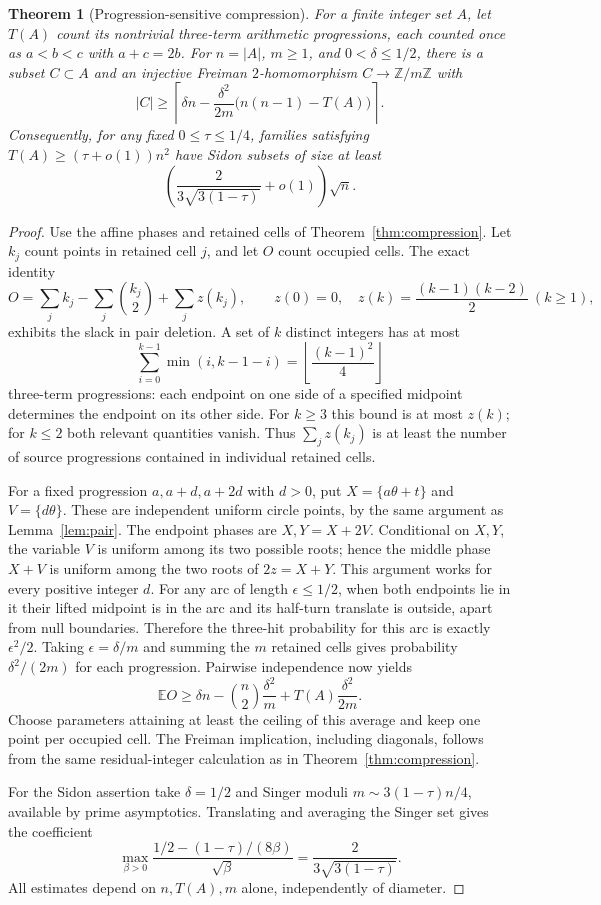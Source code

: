 \documentclass[11pt]{article}
\newtheorem{theorem}{Theorem}[section]
\theoremstyle{definition}
\theoremstyle{remark}
\newcommand{\Z}{\mathbb Z}
\newcommand{\E}{\mathbb E}
\begin{document}
\begin{theorem}[Progression-sensitive compression]\label{thm:ap-surplus}
For a finite integer set $A$, let $T(A)$ count its nontrivial three-term
arithmetic progressions, each counted once as $a<b<c$ with $a+c=2b$.
For $n=|A|$, $m\ge1$, and $0<\delta\le1/2$, there is a subset
$C\subset A$ and an injective Freiman $2$-homomorphism
$C\to\Z/m\Z$ with
\[
|C|\ge\left\lceil\delta n-
\frac{\delta^2}{2m}\bigl(n(n-1)-T(A)\bigr)\right\rceil.
\]
Consequently, for any fixed $0\le\tau\le1/4$, families satisfying
$T(A)\ge(\tau+o(1))n^2$ have Sidon subsets of size at least
\[
\left(\frac{2}{3\sqrt{3(1-\tau)}}+o(1)\right)\sqrt n.
\]
\end{theorem}
\begin{proof}
Use the affine phases and retained cells of
Theorem~\ref{thm:compression}. Let $k_j$ count points in retained cell
$j$, and let $O$ count occupied cells. The exact identity
\[
O=\sum_j k_j-\sum_j\binom{k_j}{2}+\sum_j z(k_j),
\qquad z(0)=0,\quad z(k)=\frac{(k-1)(k-2)}2\ (k\ge1),
\]
exhibits the slack in pair deletion. A set of $k$ distinct integers
has at most
\[
\sum_{i=0}^{k-1}\min(i,k-1-i)
=\left\lfloor\frac{(k-1)^2}{4}\right\rfloor
\]
three-term progressions: each endpoint on one side of a specified
midpoint determines the endpoint on its other side. For $k\ge3$ this
bound is at most $z(k)$; for $k\le2$ both relevant quantities vanish.
Thus $\sum_jz(k_j)$ is at least the number of source progressions
contained in individual retained cells.

For a fixed progression $a,a+d,a+2d$ with $d>0$, put
$X=\{a\theta+t\}$ and $V=\{d\theta\}$. These are independent
uniform circle points, by the same argument as Lemma~\ref{lem:pair}.
The endpoint phases are $X,Y=X+2V$. Conditional on $X,Y$, the variable
$V$ is uniform among its two possible roots; hence the middle phase
$X+V$ is uniform among the two roots of $2z=X+Y$.
This argument works for every positive integer $d$.
For any arc of length $\epsilon\le1/2$, when both endpoints lie in
it their lifted midpoint is in the arc and its half-turn translate
is outside, apart from null boundaries. Therefore the three-hit
probability for this arc is exactly $\epsilon^2/2$.
Taking $\epsilon=\delta/m$ and summing the $m$ retained cells gives
probability $\delta^2/(2m)$ for each progression. Pairwise independence
now yields
\[
\E O\ge\delta n-\binom n2\frac{\delta^2}{m}
+T(A)\frac{\delta^2}{2m}.
\]
Choose parameters attaining at least the ceiling of this average and
keep one point per occupied cell. The Freiman implication, including
diagonals, follows from the same residual-integer calculation as in
Theorem~\ref{thm:compression}.

For the Sidon assertion take $\delta=1/2$ and Singer moduli
$m\sim3(1-\tau)n/4$, available by prime asymptotics. Translating and
averaging the Singer set gives the coefficient
\[
\max_{\beta>0}
\frac{1/2-(1-\tau)/(8\beta)}{\sqrt\beta}
=\frac{2}{3\sqrt{3(1-\tau)}}.
\]
All estimates depend on $n,T(A),m$ alone, independently of diameter.
\end{proof}
\end{document}
